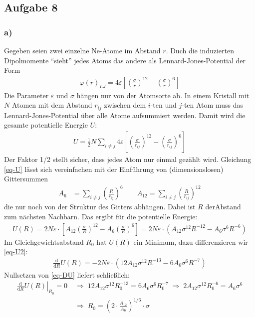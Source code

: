 \documentclass[11pt]{article}
\begin{document}
\subsection*{Aufgabe 8}
\subsubsection*{a)}
Gegeben seien zwei einzelne Ne-Atome im Abstand $r$. Duch die induzierten
Dipolmomente "`sieht"' jedes Atoms das andere als Lennard-Jones-Potential der Form
\begin{align}
  \varphi(r)_{LJ} = 4 \varepsilon \left[ \left(\frac{\sigma}{r}\right)^{12} -
    \left(\frac{\sigma}{r}\right)^{6} \right]
\end{align}
Die Parameter $\varepsilon$ und $\sigma$ hängen nur von der Atomsorte ab.
In einem Kristall mit $N$ Atomen mit dem Abstand $r_{ij}$ zwischen dem
$i$-ten und $j$-ten Atom muss das Lennard-Jones-Potential über alle Atome
aufsummiert werden. Damit wird die gesamte potentielle Energie $U$:
\begin{align}
\label{eq-U}
  U = \frac{1}{2} N \sum_{i \ne j} 4 \varepsilon
  \left[ \left(\frac{\sigma}{r_{ij}}\right)^{12} -
  \left(\frac{\sigma}{r_{ij}}\right)^{6} \right]
\end{align}
Der Faktor 1/2 stellt sicher, dass jedes Atom nur einmal gezählt wird.
Gleichung \eqref{eq-U} lässt sich vereinfachen mit der Einführung von
(dimensionslosen) Gittersummen
\begin{align*}
  A_6 & = \left . \sum_{i \ne j} \left(\frac{R}{r_{ij}}\right)^6 \right .\qquad
  A_{12} = \sum_{i \ne j} \left(\frac{R}{r_{ij}}\right)^{12}
\end{align*}
die nur noch von der Struktur des Gitters abhängen.  Dabei ist $R$ derAbstand
zum nächsten Nachbarn. Das ergibt für die potentielle Energie:
\begin{align}
\label{eq-U2}
  U(R) = 2 N \varepsilon \cdot \left[ A_{12} \left(\frac{\sigma}{R}\right)^{12} -
  A_6 \left(\frac{\sigma}{R}\right)^{6} \right] =
  2 N \varepsilon \cdot \left( A_{12} \sigma^{12} R^{-12} -
  A_6 \sigma^6 R^{-6} \right)
\end{align}
Im Gleichgewichtsabstand $R_0$ hat $U(R)$ ein Minimum, dazu differenzieren
wir \eqref{eq-U2}:
\begin{align}
\label{eq-DU}
  \frac{\mathrm{d}}{\mathrm{d} R} U(R) = - 2 N \varepsilon \cdot
    \left(12 A_{12} \sigma^{12} R^{-13} - 6 A_6 \sigma^6 R^{-7} \right)
\end{align}
Nullsetzen von \eqref{eq-DU} liefert schließlich:
\begin{align*}
  \left. \frac{\mathrm{d}}{\mathrm{d} R} U(R) \right|_{R_0} = 0 \;& \Rightarrow\;
  12 A_{12} \sigma^{12} R_0^{-13} = 6 A_6 \sigma^6 R_0^{-7} \; \Rightarrow\;
  2 A_{12} \sigma^{12} R_0^{-6} = A_6 \sigma^6\\
  \;& \Rightarrow\; R_0 = \left( 2 \cdot \frac{A_{12}}{A_6}\right)^{1/6} \cdot \sigma
\end{align*}
\end{document}
